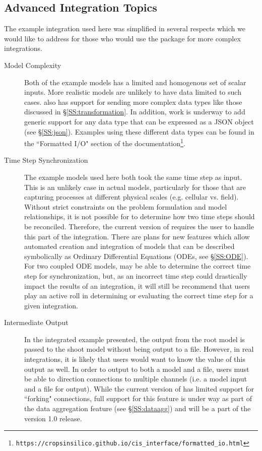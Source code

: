 \documentclass[journal]{IEEEtran}
\newcommand{\todo}[1]{{\color{red}{#1}}}
\newcommand{\pkg}{{\tt \todo{cis\_interface}}{}}
\begin{document}
\subsection{Advanced Integration Topics}
%
The example integration used here was simplified in several respects which we would like to address for those who would use the package for more complex integrations.
\begin{description}
\item[Model Complexity] Both of the example models has a limited and homogenous set of scalar inputs. More realistic models are unlikely to have data limited to such cases. {\pkg} also has support for sending more complex data types like those discussed in \S\ref{SS:transformation}. In addition, work is underway to add generic support for any data type that can be expressed as a JSON object (see \S\ref{SS:json}). Examples using these different data types can be found in the ``Formatted I/O" section of the documentation\footnote{{\tt https://cropsinsilico.github.io/cis\_interface/formatted\_io.html}}.
\item[Time Step Synchronization] The example models used here both took the same time step as input. This is an unlikely case in actual models, particularly for those that are capturing processes at different physical scales (e.g. cellular vs. field). Without strict constraints on the problem formulation and model relationships, it is not possible for {\pkg} to determine how two time steps should be reconciled. Therefore, the current version of {\pkg} requires the user to handle this part of the integration. There are plans for new features which allow automated creation and integration of models that can be described symbolically as Ordinary Differential Equations (ODEs, see \S\ref{SS:ODE}). For two coupled ODE models, {\pkg} may be able to determine the correct time step for synchronization, but, as an incorrect time step could drastically impact the results of an integration, it will still be recommend that users play an active roll in determining or evaluating the correct time step for a given integration.
\item[Intermediate Output] In the integrated example presented, the output from the root model is passed to the shoot model without being output to a file. However, in real integrations, it is likely that users would want to know the value of this output as well. In order to output to both a model and a file, users must be able to direction connections to multiple channels (i.e. a model input and a file for output). While the current version of {\pkg} has limited support for ``forking" connections, full support for this feature is under way as part of the data aggregation feature (see \S\ref{SS:dataagg}) and will be a part of the version 1.0 release.
\end{description}
\end{document}
